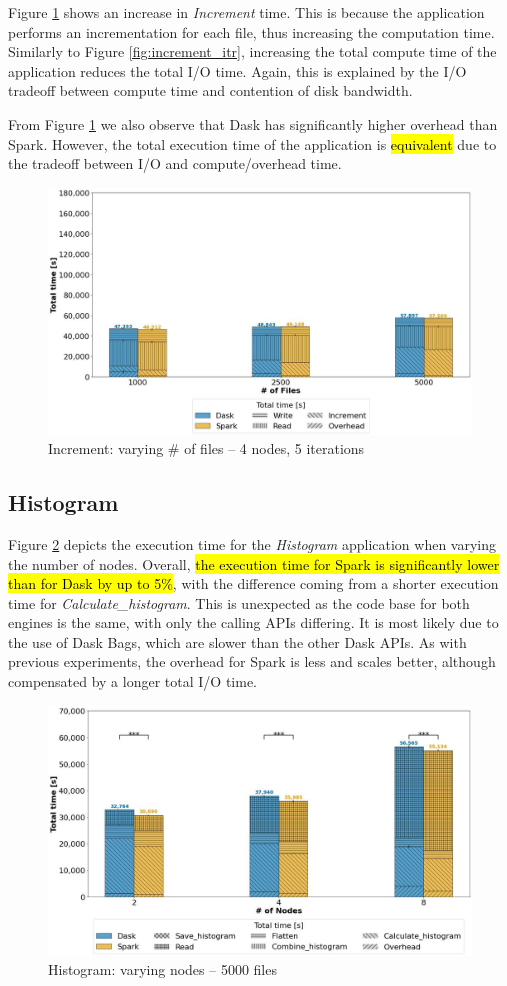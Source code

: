 \documentclass[AMA,STIX1COL]{WileyNJD-v2}
\newcommand{\HL}[1]{\hl{#1}}
\begin{document}
Figure \ref{fig:increment_block} shows an increase in \textit{Increment} time.
This is because the application performs an incrementation for each file, thus increasing the computation time.
Similarly to Figure \ref{fig:increment_itr}, increasing the total compute time of the application reduces the total I/O time.
Again, this is explained by the I/O tradeoff between compute time and contention of disk bandwidth.
					
From Figure \ref{fig:increment_block} we also observe that Dask has significantly higher overhead than Spark.
However, the total execution time of the application is \HL{equivalent} due to the tradeoff between I/O and compute/overhead time.
\begin{figure}[!h]
	\centering
	\includegraphics[clip,width=0.75\columnwidth]{figures/stacked_increment_block.jpg}
	\caption{Increment: varying \# of files -- 4 nodes, 5 iterations}
	\label{fig:increment_block}
\end{figure}
									
\subsection{Histogram}
Figure \ref{fig:histogram_worker} depicts the execution time for the \textit{Histogram} application when varying the number of nodes.
Overall, \HL{the execution time for Spark is significantly lower than for Dask by up to 5\%}, with the difference coming from a shorter execution time for \textit{Calculate\_histogram}.
This is unexpected as the code base for both engines is the same, with only the calling APIs differing.
It is most likely due to the use of Dask Bags, which are slower than the other Dask APIs.
As with previous experiments, the overhead for Spark is less and scales better, although compensated by a longer total I/O time.
\begin{figure}[!h]
	\centering
	\includegraphics[clip,width=0.75\columnwidth]{figures/stacked_histogram_worker.jpg}
	\caption{Histogram: varying nodes -- 5000 files}
	\label{fig:histogram_worker}
\end{figure}
								
\end{document}
